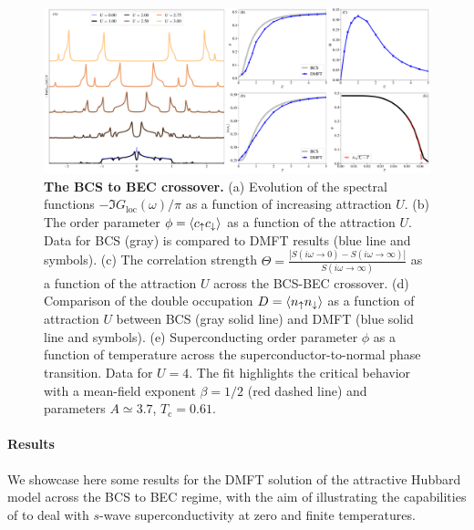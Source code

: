 \documentclass[edipack2.tex]{subfiles}
\begin{document}
\begin{figure}[t!]
  \includegraphics[width=\linewidth]{figures/figAHM.pdf}
    \caption{\label{figEx2}%
      \textbf{The BCS to BEC crossover.}
      (a) Evolution of the spectral functions
      $-\Im{G_\mathrm{loc}(\omega)}/\pi$ as a function of increasing
      attraction $U$. 
      (b) The order parameter $\phi=\langle c_\uparrow c_\downarrow\rangle$ as a
      function of the attraction $U$. Data for BCS (gray) is compared
      to DMFT results (blue line and symbols). 
      (c) The correlation strength
      $\Theta=\frac{|S(i\omega\to0)-S(i\omega\to\infty)|}{S(i\omega\to\infty)}$ as a function of the
      attraction $U$ across the BCS-BEC crossover. 
      (d) Comparison of the double occupation $D=\langle n_\uparrow
      n_\downarrow\rangle$ as a function of attraction $U$ between BCS (gray
      solid line) and DMFT (blue solid line and symbols). 
      (e) Superconducting order
      parameter $\phi$ as a function of temperature across the
      superconductor-to-normal phase transition. Data for $U=4$. The
      fit highlights the critical behavior with a mean-field exponent
      $\beta=1/2$ (red dashed line) and parameters $A\simeq 3.7$, $T_\mathrm{c}=0.61$.       
        }
\end{figure}

\paragraph{Results}
We showcase here some results for the DMFT solution of the attractive
Hubbard model across the BCS to BEC regime, with the aim of
illustrating the capabilities of \NAME to deal with $s$-wave
superconductivity at zero and finite temperatures.
\end{document}
